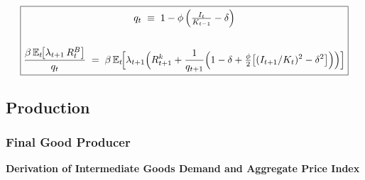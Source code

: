 \documentclass[11pt,preprint]{elsarticle}
\numberwithin{equation}{section}
\numberwithin{figure}{section}
\numberwithin{table}{section}
\begin{document}
\begin{equation}\label{capital_euler_app}
\boxed{
  \begin{gathered}
  q_t \;\equiv\; 1 - \phi\,\Bigl(\tfrac{I_t}{K_{t-1}} - \delta\Bigr) \\
  \\
  \frac{\beta\,\mathbb{E}_t\!\bigl[\lambda_{t+1}\,R_t^B\bigr]}{q_t}
  \;=\;
  \beta\,\mathbb{E}_t\!\Bigl[
    \lambda_{t+1}\Bigl(
      R_{t+1}^k
      + \frac{1}{q_{t+1}}
        \Bigl(
          1 - \delta
          + \tfrac{\phi}{2}\bigl[(I_{t+1}/K_t)^2 - \delta^2\bigr]
        \Bigr)
    \Bigr)
  \Bigr]
  \end{gathered}
}
\end{equation}

\subsection{Production}\label{production-1}

\subsubsection{\texorpdfstring{Final Good Producer
\label{final_good_producer_appendix}}{Final Good Producer }}\label{final-good-producer}

\textbf{Derivation of Intermediate Goods Demand and Aggregate Price
Index}
\end{document}
